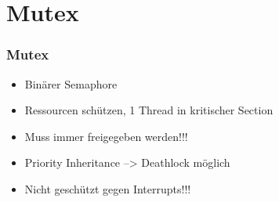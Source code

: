 \section{Mutex}
\begin{frame}
  \tableofcontents[
	    currentsection, 
	    hideothersections, 
	    sectionstyle=show/shaded, 
	    subsectionstyle=hide
	]
\end{frame}


\begin{frame}
  \frametitle{Mutex}
	\begin{itemize}
	\item Binärer Semaphore
	\item Ressourcen schützen, 1 Thread in kritischer Section
	\item Muss immer freigegeben werden!!!
	\item Priority Inheritance --> Deathlock möglich
	\item Nicht geschützt gegen Interrupts!!!
	\end{itemize}
\end{frame}

